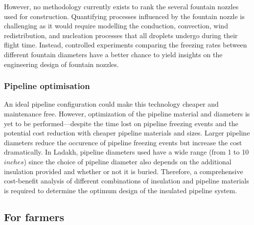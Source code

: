 However, no methodology currently exists to rank the several fountain nozzles used for construction. Quantifying
processes influenced by the fountain nozzle is challenging as it would require modelling the conduction,
convection, wind redistribution, and nucleation processes that all droplets undergo during their flight time.
Instead, controlled experiments comparing the freezing rates between different fountain diameters have a better
chance to yield insights on the engineering design of fountain nozzles.

\subsubsection{Pipeline optimisation}

An ideal pipeline configuration could make this technology cheaper and maintenance free. However, optimization
of the pipeline material and diameters is yet to be performed---despite the time lost on pipeline freezing
events and the potential cost reduction with cheaper pipeline materials and sizes. Larger pipeline diameters
reduce the occurence of pipeline freezing events but increase the cost dramatically. In Ladakh, pipeline
diameters used have a wide range (from 1 to 10 $inches$) since the choice of pipeline diameter also depends on
the additional insulation provided and whether or not it is buried. Therefore, a comprehensive cost-benefit
analysis of different combinations of insulation and pipeline materials is required to determine the optimum
design of the insulated pipeline system.  




\subsection{For farmers}

